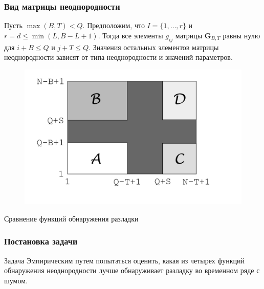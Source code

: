\documentclass[11pt]{beamer}
\begin{document}
	\begin{frame}
		\frametitle{Вид матрицы неоднородности}
		Пусть $ \max(B, T) < Q $. Предположим, что $ I = \{1, \dots, r\} $ и $ r = d \leq \min(L, B-L+1) $. Тогда все элементы $ g_{ij} $ матрицы $ \mathbf{G}_{B, T} $ равны нулю для $ i+B \leq Q $ и $ j+T \leq Q $. Значения остальных элементов матрицы неоднородности зависят от типа неоднородности и значений параметров.
		
		\begin{figure}[b]
			\centering
			\includegraphics[width=0.7\linewidth]{imgs/H-matrix}
		\end{figure}
	\end{frame}

	\begin{frame}
		\centering
		Сравнение функций обнаружения разладки
	\end{frame}

	\begin{frame}
		\frametitle{Постановка задачи}
		\begin{block}{Задача}
			Эмпирическим путем попытаться оценить, какая из четырех функций обнаружения неоднородности лучше обнаруживает разладку во временном ряде с шумом.
		\end{block}
		
	\end{frame}	
	
\end{document}
